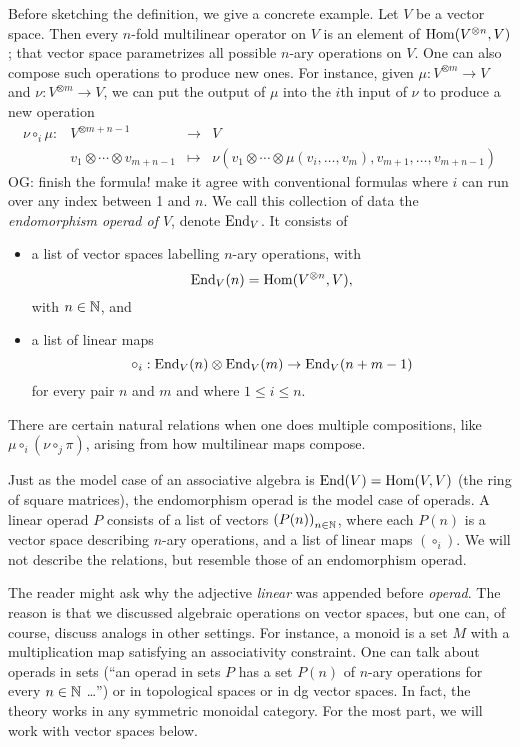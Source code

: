 \documentclass[11pt]{amsart}
\def\owen#1{{\textcolor{violet!65!black}{OG: {#1}}}}
\begin{document}
Before sketching the definition, we give a concrete example.
Let $V$ be a vector space.
Then every $n$-fold multilinear operator on $V$ is an element of ${\rm Hom}(V^{\otimes n}, V)$;
that vector space parametrizes all possible $n$-ary operations on $V$.
One can also compose such operations to produce new ones.
For instance, given $\mu : V^{\otimes m} \to V$ and $\nu: V^{\otimes m} \to V$, we can put the output of $\mu$ into the $i$th input of $\nu$ to produce a new operation
\[
\begin{array}{cccc}
\nu \circ_i \mu: & V^{\otimes m+n-1} & \to & V\\
& v_1 \otimes \cdots \otimes v_{m+n-1} & \mapsto & \nu(v_1 \otimes \cdots \otimes \mu(v_i, \ldots, v_m), v_{m+1}, \ldots, v_{m+n-1})
\end{array}
\]
\owen{finish the formula! make it agree with conventional formulas}
where $i$ can run over any index between 1 and $n$.
We call this collection of data the {\em endomorphism operad of $V$}, denote ${\rm End}_V$.
It consists of 
\begin{itemize}
\item a list of vector spaces labelling $n$-ary operations, with 
\[
{\rm End}_V(n)= {\rm Hom}(V^{\otimes n}, V),
\]
with $n \in \mathbb N$, and
\item a list of linear maps
\[
\circ_i : {\rm End}_V(n) \otimes {\rm End}_V(m) \to {\rm End}_V(n+m-1)
\]
for every pair $n$ and $m$ and where $1 \leq i \leq n$.
\end{itemize}
There are certain natural relations when one does multiple compositions, like $\mu \circ_i (\nu \circ_j \pi)$, arising from how multilinear maps compose.

Just as the model case of an associative algebra is ${\rm End}(V) = {\rm Hom}(V,V)$ (the ring of square matrices),
the endomorphism operad is the model case of operads.
A linear operad $P$ consists of a list of vectors $\left(P(n) \right)_{n \in \mathbb N}$, where each $P(n)$ is a vector space describing $n$-ary operations, and a list of linear maps $\left(\circ_i\right)$.
We will not describe the relations, but resemble those of an endomorphism operad.

\begin{rmk}
The reader might ask why the adjective {\em linear} was appended before {\em operad}.
The reason is that we discussed algebraic operations on vector spaces,
but one can, of course, discuss analogs in other settings.
For instance, a monoid is a set $M$ with a multiplication map satisfying an associativity constraint.
One can talk about operads in sets (``an operad in sets $P$ has a set $P(n)$ of $n$-ary operations for every $n \in \mathbb N$ \dots'') or in topological spaces or in dg vector spaces.
In fact, the theory works in any symmetric monoidal category. 
For the most part, we will work with vector spaces below.
\end{rmk}
\end{document}
